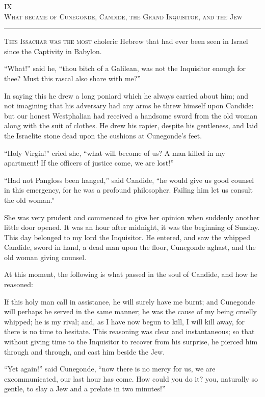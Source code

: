 \begin{center}
IX\\
\textsc{What became of Cunegonde, Candide, the Grand Inquisitor, and the Jew}
\end{center}
\vspace{-0.5cm}
\rule{\textwidth}{0.5pt}
\lettrine{T}{his Issachar was the most} choleric Hebrew that had ever been seen in Israel since the Captivity in Babylon.

``What!'' said he, ``thou bitch of a Galilean, was not the Inquisitor enough for thee? Must this rascal also share with me?''

In saying this he drew a long poniard which he always carried about him; and not imagining that his adversary had any arms he threw himself upon Candide: but our honest Westphalian had received a handsome sword from the old woman along with the suit of clothes. He drew his rapier, despite his gentleness, and laid the Israelite stone dead upon the cushions at Cunegonde's feet.

``Holy Virgin!'' cried she, ``what will become of us? A man killed in my apartment! If the officers of justice come, we are lost!''

``Had not Pangloss been hanged,'' said Candide, ``he would give us good counsel in this emergency, for he was a profound philosopher. Failing him let us consult the old woman.''

She was very prudent and commenced to give her opinion when suddenly another little door opened. It was an hour after midnight, it was the beginning of Sunday. This day belonged to my lord the Inquisitor. He entered, and saw the whipped Candide, sword in hand, a dead man upon the floor, Cunegonde aghast, and the old woman giving counsel.

At this moment, the following is what passed in the soul of Candide, and how he reasoned:

If this holy man call in assistance, he will surely have me burnt; and Cunegonde will perhaps be served in the same manner; he was the cause of my being cruelly whipped; he is my rival; and, as I have now begun to kill, I will kill away, for there is no time to hesitate. This reasoning was clear and instantaneous; so that without giving time to the Inquisitor to recover from his surprise, he pierced him through and through, and cast him beside the Jew.

``Yet again!'' said Cunegonde, ``now there is no mercy for us, we are excommunicated, our last hour has come. How could you do it? you, naturally so gentle, to slay a Jew and a prelate in two minutes!''

